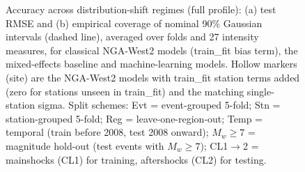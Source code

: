 \begin{figure}[htbp]
\centering
{}
\caption{Accuracy across distribution-shift regimes (full profile): (a) test RMSE and (b) empirical coverage of nominal 90\% Gaussian intervals (dashed line), averaged over folds and 27 intensity measures, for classical NGA-West2 models (train\_fit bias term), the mixed-effects baseline and machine-learning models. Hollow markers (site) are the NGA-West2 models with train\_fit station terms added (zero for stations unseen in train\_fit) and the matching single-station sigma. Split schemes: Evt = event-grouped 5-fold; Stn = station-grouped 5-fold; Reg = leave-one-region-out; Temp = temporal (train before 2008, test 2008 onward); $M_w{\geq}7$ = magnitude hold-out (test events with $M_w \geq 7$); CL1$\rightarrow$2 = mainshocks (CL1) for training, aftershocks (CL2) for testing.}
\label{fig:fig3_regime_accuracy}
\end{figure}
